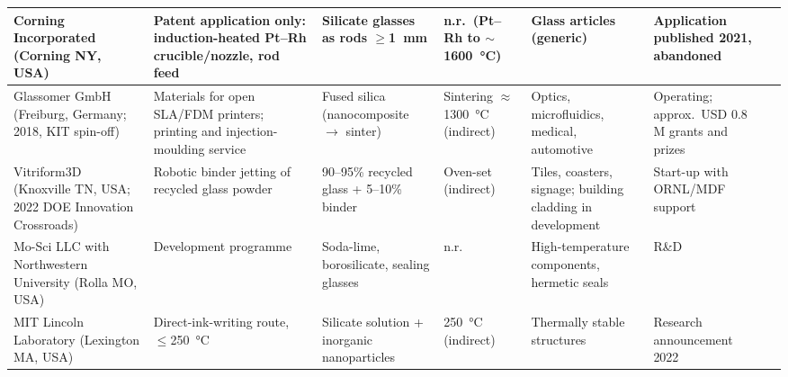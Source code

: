 \begin{table}
\begin{tabular}{@{}L{2.6cm}L{2.7cm}L{3.2cm}L{2.3cm}L{3.4cm}L{3.6cm}L{2.2cm}@{}}
    Corning Incorporated (Corning NY, USA) & Patent application only: induction-heated Pt--Rh crucible/nozzle, rod feed & Silicate glasses as rods \(\ge\)\SI{1}{mm} & n.r.\ (Pt--Rh to \(\sim\)\SI{1600}{\celsius}) & Glass articles (generic) & Application published 2021, abandoned & \citep{patent_corning2021}\\
    \midrule
    Glassomer GmbH (Freiburg, Germany; 2018, KIT spin-off) & Materials for open SLA/FDM printers; printing and injection-moulding service & Fused silica (nanocomposite \(\to\) sinter) & Sintering \(\approx\)\SI{1300}{\celsius} (indirect) & Optics, microfluidics, medical, automotive & Operating; approx.\ USD 0.8 M grants and prizes & \citep{glassomer_interview,glassomer_crunchbase,kotz2017}\\
    Vitriform3D (Knoxville TN, USA; 2022 DOE Innovation Crossroads) & Robotic binder jetting of recycled glass powder & 90--95\% recycled glass + 5--10\% binder & Oven-set (indirect) & Tiles, coasters, signage; building cladding in development & Start-up with ORNL/MDF support & \citep{ornl2026}\\
    Mo-Sci LLC with Northwestern University (Rolla MO, USA) & Development programme & Soda-lime, borosilicate, sealing glasses & n.r. & High-temperature components, hermetic seals & R\&D & \citep{mosci_web}\\
    MIT Lincoln Laboratory (Lexington MA, USA) & Direct-ink-writing route, \(\le\)\SI{250}{\celsius} & Silicate solution + inorganic nanoparticles & \SI{250}{\celsius} (indirect) & Thermally stable structures & Research announcement 2022 & \citep{acers2024recent}\\
    \bottomrule
  \end{tabular}
\end{table}
